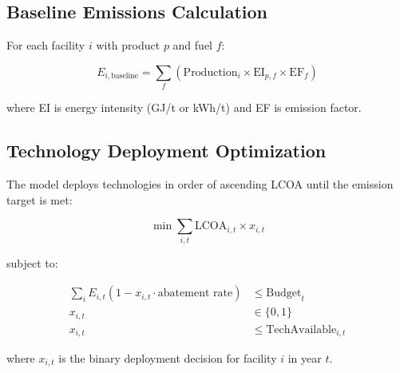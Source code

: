 \documentclass[12pt,a4paper]{article}
\begin{document}
\subsection{Baseline Emissions Calculation}

For each facility $i$ with product $p$ and fuel $f$:

\begin{equation}
E_{i,\text{baseline}} = \sum_f \left( \text{Production}_i \times \text{EI}_{p,f} \times \text{EF}_f \right)
\end{equation}

where EI is energy intensity (GJ/t or kWh/t) and EF is emission factor.

\subsection{Technology Deployment Optimization}

The model deploys technologies in order of ascending LCOA until the emission target is met:

\begin{equation}
\min \sum_{i,t} \text{LCOA}_{i,t} \times x_{i,t}
\end{equation}

subject to:

\begin{align}
\sum_i E_{i,t}(1 - x_{i,t} \cdot \text{abatement rate}) &\leq \text{Budget}_t \\
x_{i,t} &\in \{0, 1\} \\
x_{i,t} &\leq \text{TechAvailable}_{i,t}
\end{align}

where $x_{i,t}$ is the binary deployment decision for facility $i$ in year $t$.

\end{document}

